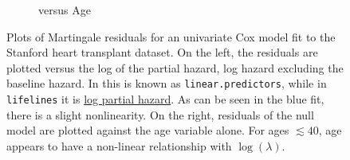 \begin{figure}[H]
\begin{subfigure}[c]{0.48\textwidth}
  \caption{versus Age}
  \label{fig:cox:martingale_residuals:age}
  \end{subfigure}
\caption{
Plots of Martingale residuals for
an univariate Cox model fit to the Stanford heart transplant dataset.
On the left, the residuals are plotted versus the
log of the partial hazard, \ie log hazard excluding the baseline hazard.
In \R this is known as \texttt{linear.predictors}, while in \texttt{lifelines} it is
\href{https://lifelines.readthedocs.io/en/latest/fitters/regression/CoxPHFitter.html\#lifelines.fitters.coxph_fitter.SemiParametricPHFitter.predict_log_partial_hazard}{log partial hazard}.
As can be seen in the blue fit, there is a slight nonlinearity.
On the right, residuals of the null model are plotted against the age variable alone.
For ages $\lesssim 40$, age appears to have a non-linear relationship with $\log\left(\lambda\right)$.
}
\label{fig:cox:martingale_residuals}
\end{figure}

